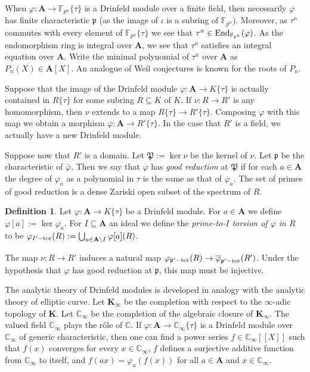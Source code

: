 \documentclass{amsart}
\newcommand{\CC}{{\mathbb C}}
\newcommand{\FF}{{\mathbb F}}
\newcommand{\fp}{{\mathfrak p}}
\newcommand{\fP}{{\mathfrak P}}
\newcommand{\bA}{{\mathbf A}}
\newcommand{\bK}{{\mathbf K}}
\theoremstyle{definition}
\newtheorem{Def}[thm]{Definition}
\theoremstyle{remark}
\begin{document}
When $\varphi:\bA \to \FF_{p^n} \{ \tau \}$ is a Drinfeld module over a finite field, then
necessarily $\varphi$ has finite characteristic $\fp$ (as the image of $\iota$ is a subring 
of $\FF_{p^n}$).  Moreover, as $\tau^n$ commutes with every element of $\FF_{p^n} \{ \tau \}$ we see that 
$\tau^n \in {\rm End}_{\FF_{p^n}} (\varphi)$.  As the endomorphism ring is integral over 
$\bA$, we see that $\tau^n$ satisfies an integral equation over $\bA$.
Write the minimal polynomial of $\tau^n$ over $\bA$ as $P_n(X) \in \bA[X]$.  
An analogue of Weil conjectures is known for the roots of $P_n$.


Suppose that the image of the Drinfeld module $\varphi:\bA \to K \{ \tau \}$ is actually 
contained in $R \{ \tau \}$ for some subring $R \subseteq K$ of $K$.  If $\nu:R \to R'$ is 
any homomorphism, then $\nu$ extends to a map $R \{ \tau \} \to R' \{ \tau \}$.  Composing $\varphi$
with this map we obtain a morphism $\overline{\varphi}: \bA \to R' \{ \tau \}$.  In the case that
$R'$ is a field, we actually have a new Drinfeld module.  

Suppose now that $R'$ is a domain.  Let $\fP := \ker{\nu}$ be the kernel of $\nu$.  Let 
$\fp$ be the characteristic of $\overline{\varphi}$. Then
we say that $\varphi$ has \emph{good reduction} at $\fP$ if for each $a \in \bA$ the 
degree of $\varphi_a$ as a polynomial in $\tau$ is the same as that of $\overline{\varphi}_a$. 
The set of primes of good reduction is a dense Zariski open subset of the spectrum of $R$.  

\begin{Def}
Let $\varphi:\bA \to K \{ \tau \}$ be a Drinfeld module.  For $a \in \bA$ we define 
$\varphi[a] := \ker \varphi_a$.  For $I \subseteq \bA$ an ideal we define the 
\emph{prime-to-$I$ torsion of $\varphi$ in $R$} to be 
$\varphi_{I'-{\rm tor}}(R) := \bigcup_{a \in \bA \setminus I} \varphi[a](R)$.  
\end{Def}

The map $\nu:R \to R'$ induces a natural map $\varphi_{\fp'-{\rm tor}} (R) \to \overline{\varphi}_{\fp'-{\rm tor}}(R')$.
Under the hypothesis that $\varphi$ has good reduction at $\fp$, this map must be injective.


The analytic theory of Drinfeld modules is developed in analogy with the analytic theory of 
elliptic curve.  Let $\bK_\infty$ be the completion with respect to the $\infty$-adic topology of 
$\bK$.  Let $\CC_\infty$ be the completion of the algebraic closure of $\bK_\infty$.  The valued
field $\CC_\infty$ plays the r\^{o}le of $\CC$.  If $\varphi:\bA \to \CC_\infty \{\tau\}$ is 
a Drinfeld module over $\CC_\infty$ of generic characteristic,
then one can find a power series $f \in \CC_\infty [[X]]$ 
such that $f(x)$ converges for every $x \in \CC_\infty$, $f$ defines a surjective additive function 
from $\CC_\infty$ to itself, and $f(ax) = \varphi_a (f(x))$ for all $a \in \bA$ and $x \in \CC_\infty$.
\end{document}
